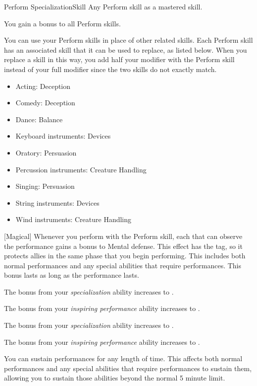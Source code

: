    \begin{feat}{Perform Specialization}{Skill}
        \featpre Any Perform skill as a mastered skill.

         You gain a  bonus to all Perform skills.

         You can use your Perform skills in place of other related skills.
        Each Perform skill has an associated skill that it can be used to replace, as listed below.
        When you replace a skill in this way, you add half your modifier with the Perform skill instead of your full modifier since the two skills do not exactly match.
        \begin{itemize}
            \item Acting: Deception
            \item Comedy: Deception
            \item Dance: Balance
            \item Keyboard instruments: Devices
            \item Oratory: Persuasion
            \item Percussion instruments: Creature Handling
            \item Singing: Persuasion
            \item String instruments: Devices
            \item Wind instruments: Creature Handling
        \end{itemize}

        [Magical] Whenever you perform with the Perform skill, each  that can observe the performance gains a  bonus to Mental defense.
        This effect has the  tag, so it protects allies in the same phase that you begin performing.
        This includes both normal performances and any special abilities that require performances.
        This bonus lasts as long as the performance lasts.

         The bonus from your \textit{specialization} ability increases to .

         The bonus from your \textit{inspiring performance} ability increases to .

         The bonus from your \textit{specialization} ability increases to .

         The bonus from your \textit{inspiring performance} ability increases to .

         You can sustain performances for any length of time.
        This affects both normal performances and any special abilities that require performances to sustain them, allowing you to sustain those abilities beyond the normal 5 minute limit.
    \end{feat}

